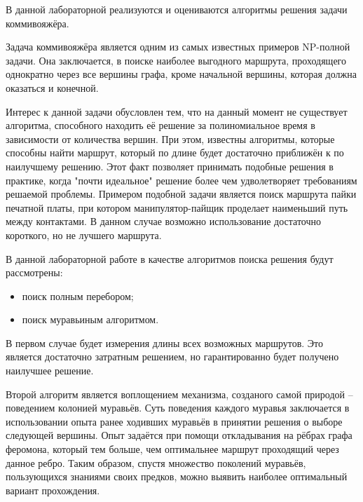 В данной лабораторной реализуются и оцениваются алгоритмы решения задачи коммивояжёра.

Задача коммивояжёра является одним из самых известных примеров NP-полной задачи. Она заключается, в поиске наиболее выгодного маршрута, проходящего однократно через все вершины графа, кроме начальной вершины, которая должна оказаться и конечной. 

Интерес к данной задачи обусловлен тем, что на данный момент не существует алгоритма, способного находить её решение за полиномиальное время в зависимости от количества вершин. При этом, известны алгоритмы, которые способны найти маршрут, который по длине будет достаточно приближён к по наилучшему решению. Этот факт позволяет принимать подобные решения в практике, когда "почти идеальное" решение более чем удволетворяет требованиям решаемой проблемы. Примером подобной задачи является поиск маршрута пайки печатной платы, при котором манипулятор-пайщик проделает наименьший путь между контактами. В данном случае возможно использование достаточно короткого, но не лучшего маршрута.

В данной лабораторной работе в качестве алгоритмов поиска решения будут рассмотрены:
\begin{itemize}
	\item поиск полным перебором;
	\item поиск муравьиным алгоритмом.
\end{itemize}

В первом случае будет измерения длины всех возможных маршрутов. Это является достаточно затратным решением, но гарантированно будет получено наилучшее решение.

Второй алгоритм является воплощением механизма, созданого самой природой -- поведением колонией муравьёв. Суть поведения каждого муравья заключается в использовании опыта ранее ходивших муравьёв в принятии решения о выборе следующей вершины. Опыт задаётся при помощи откладывания на рёбрах графа феромона, который тем больше, чем оптимальнее маршрут проходящий через данное ребро. Таким образом, спустя множество поколений муравьёв, пользующихся знаниями своих предков, можно выявить наиболее оптимальный вариант прохождения.

